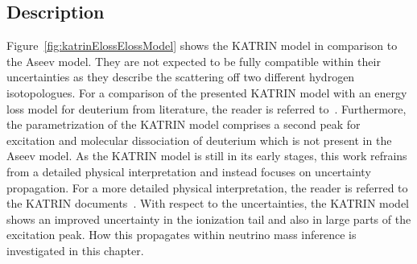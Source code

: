 \subsection{Description}
Figure~\ref{fig:katrinElossElossModel} shows the KATRIN model in comparison to the Aseev model. They are not expected to be fully compatible within their uncertainties as they describe the scattering off two different hydrogen isotopologues. For a comparison of the presented KATRIN model with an energy loss model for deuterium from literature, the reader is referred to~\cite{Rodenbeck2019}. Furthermore, the parametrization of the KATRIN model comprises a second peak for excitation and molecular dissociation of deuterium which is not present in the Aseev model. As the KATRIN model is still in its early stages, this work refrains from a detailed physical interpretation and instead focuses on uncertainty propagation. For a more detailed physical interpretation, the reader is referred to the KATRIN documents~\cite{Rodenbeck2019,Hannen2019_1,Hannen2019_2}. With respect to the uncertainties, the KATRIN model shows an improved uncertainty in the ionization tail and also in large parts of the excitation peak. How this propagates within neutrino mass inference is investigated in this chapter.

